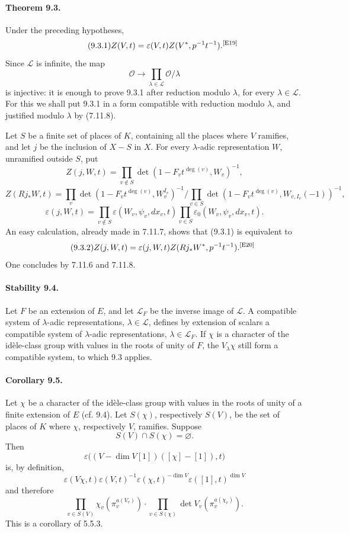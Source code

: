 \documentclass[10pt,letterpaper]{article}
\providecommand{\LLL}{\mathcal L}
\newcommand{\auditmark}[1]{\textsuperscript{\normalfont\scriptsize[E#1]}}
\begin{document}
\paragraph{Theorem 9.3.} Under the preceding hypotheses,
\[
\tag{9.3.1}
Z(V,t)=\varepsilon(V,t)Z(V^*,p^{-1}t^{-1}).\auditmark{19}
\]
Since $\LLL$ is infinite, the map
\[
\mathcal O\longrightarrow\prod_{\lambda\in\LLL}\mathcal O/\lambda
\]
is injective: it is enough to prove 9.3.1 after reduction modulo $\lambda$, for every $\lambda\in\LLL$. For this we shall put 9.3.1 in a form compatible with reduction modulo $\lambda$, and justified modulo $\lambda$ by (7.11.8).

Let $S$ be a finite set of places of $K$, containing all the places where $V$ ramifies, and let $j$ be the inclusion of $X-S$ in $X$. For every $\lambda$-adic representation $W$, unramified outside $S$, put
\[
Z(j,W,t)=\prod_{v\notin S}\det(1-F_vt^{\deg(v)},W_v)^{-1},
\]
\[
Z(Rj_*W,t)=
\prod_v\det(1-F_vt^{\deg(v)},W_v^{I_v})^{-1}
\Big/
\prod_{v\in S}\det(1-F_vt^{\deg(v)},W_{v,I_v}(-1))^{-1},
\]
\[
\varepsilon(j,W,t)=
\prod_{v\notin S}\varepsilon(W_v,\psi_v,dx_v,t)
\prod_{v\in S}\varepsilon_0(W_v,
\psi_v,dx_v,t).
\]
An easy calculation, already made in 7.11.7, shows that (9.3.1) is equivalent to
\[
\tag{9.3.2}
Z(j,W,t)=\varepsilon(j,W,t)Z(Rj_*W^*,p^{-1}t^{-1}).\auditmark{20}
\]
One concludes by 7.11.6 and 7.11.8.

\paragraph{Stability 9.4.} Let $F$ be an extension of $E$, and let $\LLL_F$ be the inverse image of $\LLL$. A compatible system of $\lambda$-adic representations, $\lambda\in\LLL$, defines by extension of scalars a compatible system of $\lambda$-adic representations, $\lambda\in\LLL_F$. If $\chi$ is a character of the idèle-class group with values in the roots of unity of $F$, the $V_\lambda\chi$ still form a compatible system, to which 9.3 applies.

\paragraph{Corollary 9.5.} Let $\chi$ be a character of the idèle-class group with values in the roots of unity of a finite extension of $E$ (cf. 9.4). Let $S(\chi)$, respectively $S(V)$, be the set of places of $K$ where $\chi$, respectively $V$, ramifies. Suppose
\[
S(V)\cap S(\chi)=\varnothing.
\]
Then
\[
\varepsilon\bigl((V-\dim V[1])([\chi]-[1]),t\bigr)
\]
is, by definition,
\[
\varepsilon(V\chi,t)\varepsilon(V,t)^{-1}
\varepsilon(\chi,t)^{-\dim V}\varepsilon([1],t)^{\dim V}
\]
and therefore
\[
\prod_{v\in S(V)}\chi_v(\pi_v^{a(V_v)})
\cdot
\prod_{v\in S(\chi)}\det V_v(\pi_v^{a(\chi_v)}).
\]
This is a corollary of 5.5.3.
\end{document}
